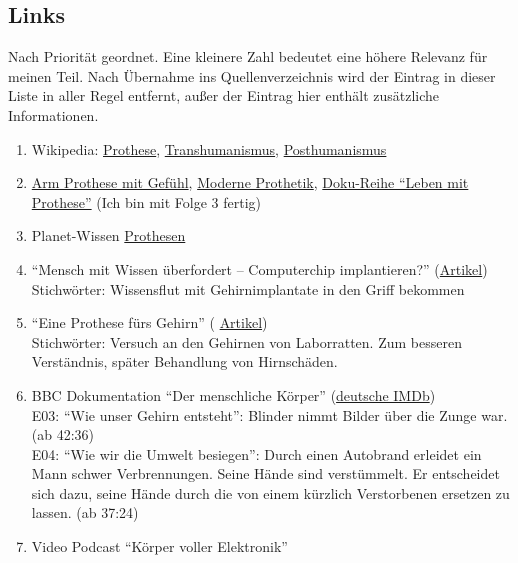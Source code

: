 \subsection*{Links}
Nach Priorität geordnet. Eine kleinere Zahl bedeutet eine höhere Relevanz für meinen Teil.
Nach Übernahme ins Quellenverzeichnis wird der Eintrag in dieser Liste in aller Regel entfernt,
außer der Eintrag hier enthält zusätzliche Informationen.
\begin{enumerate}
	\item Wikipedia: \href{http://de.wikipedia.org/wiki/Prothese}{Prothese},
		\href{http://de.wikipedia.org/wiki/Transhumanismus}{Transhumanismus},
		\href{http://de.wikipedia.org/wiki/Posthumanismus}{Posthumanismus}
	\item \href{https://www.youtube.com/watch?v=EjcSosdtQ0k}{Arm Prothese mit Gefühl},
		\href{https://www.youtube.com/watch?v=KVDsO9NAgtE}{Moderne Prothetik},
		\href{https://www.youtube.com/watch?v=7bow1_k2LIg}{Doku-Reihe \enquote{Leben mit Prothese}}
		(Ich bin mit Folge 3 fertig)
	\item Planet-Wissen
		\href{http://www.planet-wissen.de/natur_technik/anatomie_mensch/prothesen/index.jsp}%
		{Prothesen}
	\item \enquote{Mensch mit Wissen überfordert – Computerchip implantieren?}
		(\href{http://www.heise.de/newsticker/meldung/Mensch-mit-Wissen-ueberfordert-Computerchip-implantieren-1405096.html}
		{Artikel}) \\
		Stichwörter: Wissensflut mit Gehirnimplantate in den Griff bekommen
	\item \enquote{Eine Prothese fürs Gehirn}
		(%
		\href{http://heise.de/-1365074}{Artikel}) \\
		Stichwörter: Versuch an den Gehirnen von Laborratten.
			Zum besseren Verständnis, später Behandlung von Hirnschäden.
	\item BBC Dokumentation \enquote{Der menschliche Körper}
		(\href{http://www.imdb.de/title/tt1929678/}{deutsche IMDb}) \\
		E03: \enquote{Wie unser Gehirn entsteht}: Blinder nimmt Bilder über die Zunge war.
			(ab 42:36) \\
		E04: \enquote{Wie wir die Umwelt besiegen}: Durch einen Autobrand erleidet ein Mann
			schwer Verbrennungen. Seine Hände sind verstümmelt.
			Er entscheidet sich dazu, seine Hände durch die von einem kürzlich Verstorbenen ersetzen
			zu lassen. (ab 37:24)
	\item Video Podcast \enquote{Körper voller Elektronik}

\end{enumerate}
